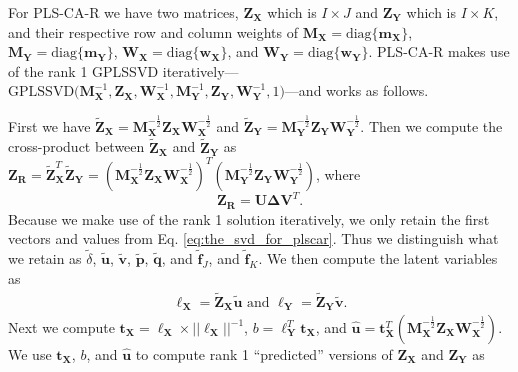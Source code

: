 \documentclass[12pt]{article}
\begin{document}
For PLS-CA-R we have two matrices, \({\mathbf Z}_{\mathbf X}\) which is
\(I \times J\) and \({\mathbf Z}_{\mathbf Y}\) which is \(I \times K\),
and their respective row and column weights of
\({\mathbf M}_{\mathbf X} = \mathrm{diag\{}{\mathbf m}_{\mathbf X} \mathrm{\}}\),
\({\mathbf M}_{\mathbf Y} = \mathrm{diag\{}{\mathbf m}_{\mathbf Y} \mathrm{\}}\),
\({\mathbf W}_{\mathbf X} = \mathrm{diag\{}{\mathbf w}_{\mathbf X} \mathrm{\}}\),
and
\({\mathbf W}_{\mathbf Y} = \mathrm{diag\{}{\mathbf w}_{\mathbf Y} \mathrm{\}}\).
PLS-CA-R makes use of the rank 1 GPLSSVD
iteratively---\(\mathrm{GPLSSVD(} {\mathbf M}_{\mathbf X}^{-1}, {\mathbf Z}_{\mathbf X}, {\mathbf W}_{\mathbf X}^{-1}, {\mathbf M}_{\mathbf Y}^{-1}, {\mathbf Z}_{\mathbf Y}, {\mathbf W}_{\mathbf Y}^{-1}, 1 \mathrm{)}\)---and
works as follows.

First we have
\(\widetilde{{\mathbf Z}}_{\mathbf X} = {\mathbf M}_{\mathbf X}^{-\frac{1}{2}}{\mathbf Z}_{\mathbf X}{\mathbf W}_{\mathbf X}^{-\frac{1}{2}}\)
and
\(\widetilde{{\mathbf Z}}_{\mathbf Y} = {\mathbf M}_{\mathbf Y}^{-\frac{1}{2}}{\mathbf Z}_{\mathbf Y}{\mathbf W}_{\mathbf Y}^{-\frac{1}{2}}\).
Then we compute the cross-product between
\(\widetilde{\mathbf Z}_{\mathbf X}\) and
\(\widetilde{\mathbf Z}_{\mathbf Y}\) as
\({\mathbf Z}_{\mathbf R} = \widetilde{\mathbf Z}_{\mathbf X}^{T}\widetilde{\mathbf Z}_{\mathbf Y} = ({\mathbf M}_{\mathbf X}^{-\frac{1}{2}}{\mathbf Z}_{\mathbf X}{\mathbf W}_{\mathbf X}^{-\frac{1}{2}})^{T}({\mathbf M}_{\mathbf Y}^{-\frac{1}{2}}{\mathbf Z}_{\mathbf Y}{\mathbf W}_{\mathbf Y}^{-\frac{1}{2}})\),
where \begin{equation}
{\mathbf Z}_{\mathbf R} = {\mathbf U} {\boldsymbol \Delta} {\mathbf V}^{T}.
\label{eq:the_svd_for_plscar}
\end{equation} Because we make use of the rank 1 solution iteratively,
we only retain the first vectors and values from Eq.
\ref{eq:the_svd_for_plscar}. Thus we distinguish what we retain as
\(\tilde\delta\), \(\widetilde{\mathbf u}\), \(\widetilde{\mathbf v}\),
\(\widetilde{\mathbf p}\), \(\widetilde{\mathbf q}\), and
\(\widetilde{\mathbf f}_{J}\), and \(\widetilde{\mathbf f}_{K}\). We
then compute the latent variables as \begin{equation}
\begin{aligned}
{\boldsymbol \ell}_{\mathbf X} = \widetilde{\mathbf Z}_{\mathbf X}\widetilde{\mathbf u} \text{ and } {\boldsymbol \ell}_{\mathbf Y} = \widetilde{\mathbf Z}_{\mathbf Y}\widetilde{\mathbf v}.
\label{eq:lvs}
\end{aligned}
\end{equation} Next we compute
\({\mathbf t}_{\mathbf X} = {\boldsymbol \ell}_{\mathbf X} \times {{\lvert\lvert {\boldsymbol \ell}_{\mathbf X} \rvert\rvert}^{-1}}\),
\(b = {\boldsymbol \ell}_{\mathbf Y}^{T}{\mathbf t}_{\mathbf X}\), and
\(\widehat{\mathbf u} = {\mathbf t}_{\mathbf X}^{T} ({\mathbf M}_{\mathbf X}^{-\frac{1}{2}}{\mathbf Z}_{\mathbf X}{\mathbf W}_{\mathbf X}^{-\frac{1}{2}})\).
We use \({\mathbf t}_{\mathbf X}\), \(b\), and \(\widehat{\mathbf u}\)
to compute rank 1 ``predicted'' versions of \({\mathbf Z}_{\mathbf X}\)
and \({\mathbf Z}_{\mathbf Y}\) as
\end{document}
